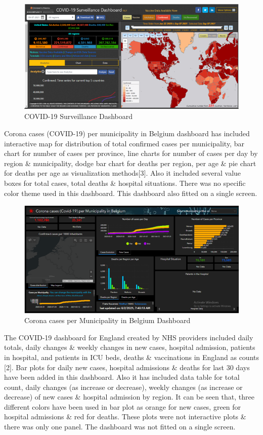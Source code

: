 \documentclass[
]{article}
\begin{document}
\begin{figure}
\includegraphics[width=8.42in]{Images/3} \caption{COVID-19 Surveillance Dashboard}\label{fig:unnamed-chunk-3}
\end{figure}

Corona cases (COVID-19) per municipality in Belgium dashboard has
included interactive map for distribution of total confirmed cases per
municipality, bar chart for number of cases per province, line charts
for number of cases per day by region \& municipality, dodge bar chart
for deaths per region, per age \& pie chart for deaths per age as
visualization methods{[}3{]}. Also it included several value boxes for
total cases, total deaths \& hospital situations. There was no specific
color theme used in this dashboard. This dashboard also fitted on a
single screen.

\begin{figure}
\includegraphics[width=8.39in]{Images/4} \caption{Corona cases per Municipality in Belgium Dashboard}\label{fig:unnamed-chunk-4}
\end{figure}

The COVID-19 dashboard for England created by NHS providers included
daily totals, daily changes \& weekly changes in new cases, hospital
admission, patients in hospital, and patients in ICU beds, deaths \&
vaccinations in England as counts {[}2{]}. Bar plots for daily new
cases, hospital admissions \& deaths for last 30 days have been added in
this dashboard. Also it has included data table for total count, daily
changes (as increase or decrease), weekly changes (as increase or
decrease) of new cases \& hospital admission by region. It can be seen
that, three different colors have been used in bar plot as orange for
new cases, green for hospital admissions \& red for deaths. These plots
were not interactive plots \& there was only one panel. The dashboard
was not fitted on a single screen.
\end{document}
